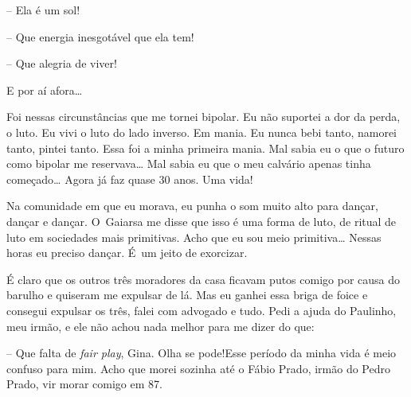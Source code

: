 -- Ela é um sol!

-- Que energia inesgotável que ela tem!

-- Que alegria de viver!

E por aí afora…

Foi nessas circunstâncias que me tornei bipolar. Eu não suportei a dor
da perda, o luto. Eu vivi o luto do lado inverso. Em mania. Eu nunca
bebi tanto, namorei tanto, pintei tanto. Essa foi a minha primeira
mania. Mal sabia eu o que o futuro como bipolar me reservava… Mal
sabia eu que o meu calvário apenas tinha começado… Agora já faz
quase 30 anos. Uma vida!

Na comunidade em que eu morava, eu punha o som muito alto para dançar,
dançar e dançar. O~Gaiarsa me disse que isso é uma forma de luto, de
ritual de luto em sociedades mais primitivas. Acho que eu sou meio
primitiva… Nessas horas eu preciso dançar. É~um jeito de
exorcizar.

É claro que os outros três moradores da casa ficavam putos comigo por
causa do barulho e quiseram me expulsar de lá. Mas eu ganhei essa briga
de foice e consegui expulsar os três, falei com advogado e tudo. Pedi a
ajuda do Paulinho, meu irmão, e ele não achou nada melhor para me dizer
do que:

-- Que falta de \emph{fair play}, Gina. Olha se pode!Esse período da
minha vida é meio confuso para mim. Acho que morei sozinha até o Fábio
Prado, irmão do Pedro Prado, vir morar comigo em 87.

